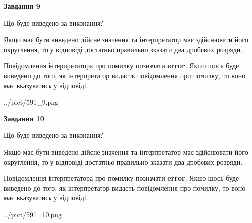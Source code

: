 \documentclass[12pt, ukrainian]{article}
\begin{document}
{\begin {Large}
{\begin {center}\textbf{Завдання 9}\end {center}}\par
Що буде виведено за виконання? \par

Якщо має бути виведено дійсне значення та інтерпретатор має здійснювати його округлення, 
то у відповіді достатньо правильно вказати два дробових розряди.

Повідомлення інтерпретатора про помилку позначати \textbf{error}.
Якщо щось буде виведено до того, як інтерпретатор видасть повідомлення про помилку, 
то воно має вказуватись у відповіді. \par

\begin{center}
	{../pict/591_9.png}
\end{center}
\newpage

{\begin {center}\textbf{Завдання 10}\end {center}}\par
Що буде виведено за виконання? \par

Якщо має бути виведено дійсне значення та інтерпретатор має здійснювати його округлення, 
то у відповіді достатньо правильно вказати два дробових розряди.

Повідомлення інтерпретатора про помилку позначати \textbf{error}.
Якщо щось буде виведено до того, як інтерпретатор видасть повідомлення про помилку, 
то воно має вказуватись у відповіді. \par

\begin{center}
	{../pict/591_10.png}
\end{center}
\newpage

\end {Large}}
\end{document}
